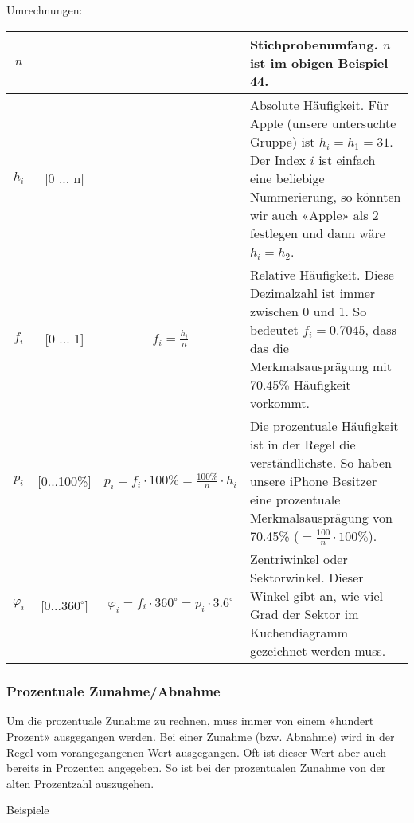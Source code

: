 Umrechnungen:

\begin{tabular}{|c|c|c|p{8cm}|}
  \hline
  $n$   &   &  &Stichprobenumfang. $n$ ist im obigen Beispiel 44.\\
  \hline
  $h_i$ & [0 ... n]  & & Absolute Häufigkeit. Für Apple (unsere untersuchte
  Gruppe) ist $h_i=h_1=31$. Der Index $i$ ist einfach eine beliebige
  Nummerierung, so könnten wir auch «Apple» als $2$ festlegen und dann
  wäre $h_i=h_2$.\\
  \hline
  $f_i$ & [0 ... 1] &$f_i = \frac{h_i}{n}$ & Relative
  Häufigkeit. Diese Dezimalzahl ist immer zwischen 0 und 1. So
  bedeutet $f_i=0.7045$, dass das die Merkmalsausprägung mit 70.45\%
  Häufigkeit vorkommt.\\
  \hline
  $p_i$ & [0...100\%] & $p_i = f_i\cdot{}100\% =
  \frac{100\%}{n}\cdot{}h_i$ & Die prozentuale Häufigkeit ist in der
  Regel die verständlichste. So haben unsere iPhone Besitzer eine
  prozentuale Merkmalsausprägung von 70.45\%
  ($=\frac{100}{n}\cdot{}100\%$).\\
  \hline
  $\varphi_i$ & [0...$360^{\circ}$] & $\varphi_i = f_i\cdot{}360^\circ
  = p_i\cdot{}3.6^\circ$ &
  Zentriwinkel oder Sektorwinkel. Dieser Winkel gibt an, wie viel Grad
  der Sektor im Kuchendiagramm gezeichnet werden muss.\\
  \hline
\end{tabular}
\newpage



\subsubsection{Prozentuale Zunahme/Abnahme}\index{\%}
Um die prozentuale Zunahme zu rechnen, muss immer von einem «hundert
Prozent» ausgegangen werden. Bei einer Zunahme (bzw. Abnahme) wird in
der Regel vom vorangegangenen Wert ausgegangen. Oft ist dieser Wert
aber auch bereits in Prozenten angegeben. So ist bei der prozentualen
Zunahme von der alten Prozentzahl auszugehen.

Beispiele

